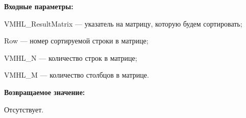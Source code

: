 \textbf{Входные параметры:}
 
VMHL\_ResultMatrix --- указатель на матрицу, которую будем сортировать;
 
Row --- номер сортируемой строки в матрице;
 
VMHL\_N --- количество строк в матрице;
 
VMHL\_M --- количество столбцов в матрице.

\textbf{Возвращаемое значение:}

Отсутствует.